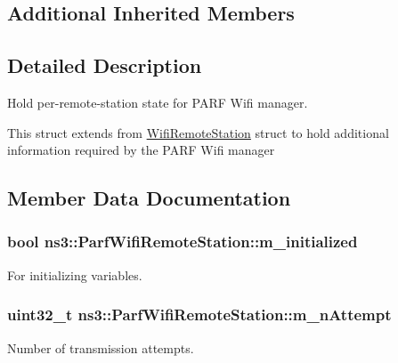 \subsection*{Additional Inherited Members}


\subsection{Detailed Description}
Hold per-\/remote-\/station state for P\+A\+RF Wifi manager.

This struct extends from \hyperlink{structns3_1_1WifiRemoteStation}{Wifi\+Remote\+Station} struct to hold additional information required by the P\+A\+RF Wifi manager 

\subsection{Member Data Documentation}
\subsubsection[{\texorpdfstring{m\+\_\+initialized}{m_initialized}}]{\setlength{\rightskip}{0pt plus 5cm}bool ns3\+::\+Parf\+Wifi\+Remote\+Station\+::m\+\_\+initialized}\hypertarget{structns3_1_1ParfWifiRemoteStation_ab939aeebdd1d940e06642b1985bb4504}{}\label{structns3_1_1ParfWifiRemoteStation_ab939aeebdd1d940e06642b1985bb4504}


For initializing variables. 

\subsubsection[{\texorpdfstring{m\+\_\+n\+Attempt}{m_nAttempt}}]{\setlength{\rightskip}{0pt plus 5cm}uint32\+\_\+t ns3\+::\+Parf\+Wifi\+Remote\+Station\+::m\+\_\+n\+Attempt}\hypertarget{structns3_1_1ParfWifiRemoteStation_ac42c729315243f1f113ded47848e9763}{}\label{structns3_1_1ParfWifiRemoteStation_ac42c729315243f1f113ded47848e9763}


Number of transmission attempts. 

